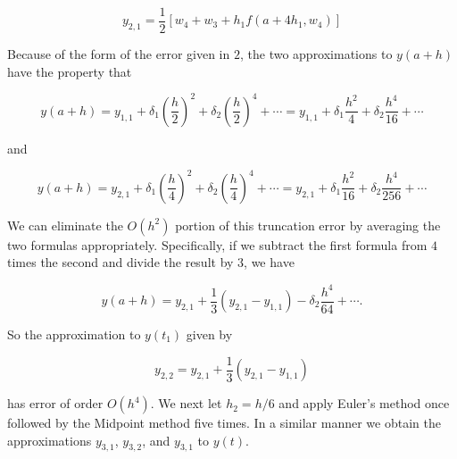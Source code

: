 $$
y_{2,1}=\frac{1}{2}\left[w_{4}+w_{3}+h_{1} f\left(a+4 h_{1}, w_{4}\right)\right]
$$

Because of the form of the error given in $2$, the two approximations to $y(a+h)$ have the property that

$$
y(a+h)=y_{1,1}+\delta_{1}\left(\frac{h}{2}\right)^{2}+\delta_{2}\left(\frac{h}{2}\right)^{4}+\cdots=y_{1,1}+\delta_{1} \frac{h^{2}}{4}+\delta_{2} \frac{h^{4}}{16}+\cdots
$$

and

$$
y(a+h)=y_{2,1}+\delta_{1}\left(\frac{h}{4}\right)^{2}+\delta_{2}\left(\frac{h}{4}\right)^{4}+\cdots=y_{2,1}+\delta_{1} \frac{h^{2}}{16}+\delta_{2} \frac{h^{4}}{256}+\cdots
$$

We can eliminate the $O\left(h^{2}\right)$ portion of this truncation error by averaging the two formulas appropriately. Specifically, if we subtract the first formula from $4$ times the second and divide the result by $3$, we have

$$
y(a+h)=y_{2,1}+\frac{1}{3}\left(y_{2,1}-y_{1,1}\right)-\delta_{2} \frac{h^{4}}{64}+\cdots .
$$

So the approximation to $y\left(t_{1}\right)$ given by

$$
y_{2,2}=y_{2,1}+\frac{1}{3}\left(y_{2,1}-y_{1,1}\right)
$$

has error of order $O\left(h^{4}\right)$.
%
%
We next let $h_{2}=h / 6$ and apply Euler's method once followed by the Midpoint method five times. In a similar manner we obtain the approximations $y_{3, 1}$, $y_{3, 2}$, and $y_{3, 1}$ to $y(t)$.


